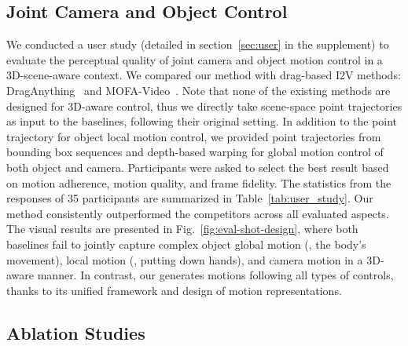 


\subsection{Joint Camera and Object Control}

We conducted a user study (detailed in section~\ref{sec:user} in the supplement) to evaluate the perceptual quality of joint camera and object motion control in a 3D-scene-aware context. We compared our method with drag-based I2V methods: DragAnything~\cite{wu2025draganything} and MOFA-Video~\cite{niu2025mofa}. 
Note that none of the existing methods are designed for 3D-aware control, thus we directly take scene-space point trajectories as input to the baselines, following their original setting.
In addition to the point trajectory for object local motion control, we provided point trajectories from bounding box sequences and depth-based warping for global motion control of both object and camera. 
Participants were asked to select the best result based on motion adherence, motion quality, and frame fidelity. The statistics from the responses of 35 participants are summarized in Table~\ref{tab:user_study}. Our method consistently outperformed the competitors across all evaluated aspects. The visual results are presented in Fig.~\ref{fig:eval-shot-design}, where both baselines fail to jointly capture complex object global motion (\ie, the body's movement), local motion (\ie, putting down hands), and camera motion in a 3D-aware manner. In contrast, our \MOCA generates motions following all types of controls, thanks to its unified framework and design of motion representations.





\subsection{Ablation Studies}

